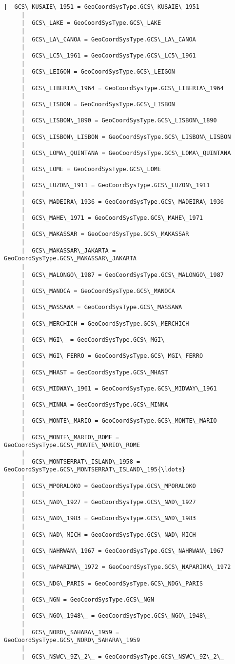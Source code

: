 \documentclass[11pt]{article}
\begin{document}
\begin{Verbatim}[commandchars=\\\{\}]
     |  GCS\_KUSAIE\_1951 = GeoCoordSysType.GCS\_KUSAIE\_1951
     |  
     |  GCS\_LAKE = GeoCoordSysType.GCS\_LAKE
     |  
     |  GCS\_LA\_CANOA = GeoCoordSysType.GCS\_LA\_CANOA
     |  
     |  GCS\_LC5\_1961 = GeoCoordSysType.GCS\_LC5\_1961
     |  
     |  GCS\_LEIGON = GeoCoordSysType.GCS\_LEIGON
     |  
     |  GCS\_LIBERIA\_1964 = GeoCoordSysType.GCS\_LIBERIA\_1964
     |  
     |  GCS\_LISBON = GeoCoordSysType.GCS\_LISBON
     |  
     |  GCS\_LISBON\_1890 = GeoCoordSysType.GCS\_LISBON\_1890
     |  
     |  GCS\_LISBON\_LISBON = GeoCoordSysType.GCS\_LISBON\_LISBON
     |  
     |  GCS\_LOMA\_QUINTANA = GeoCoordSysType.GCS\_LOMA\_QUINTANA
     |  
     |  GCS\_LOME = GeoCoordSysType.GCS\_LOME
     |  
     |  GCS\_LUZON\_1911 = GeoCoordSysType.GCS\_LUZON\_1911
     |  
     |  GCS\_MADEIRA\_1936 = GeoCoordSysType.GCS\_MADEIRA\_1936
     |  
     |  GCS\_MAHE\_1971 = GeoCoordSysType.GCS\_MAHE\_1971
     |  
     |  GCS\_MAKASSAR = GeoCoordSysType.GCS\_MAKASSAR
     |  
     |  GCS\_MAKASSAR\_JAKARTA = GeoCoordSysType.GCS\_MAKASSAR\_JAKARTA
     |  
     |  GCS\_MALONGO\_1987 = GeoCoordSysType.GCS\_MALONGO\_1987
     |  
     |  GCS\_MANOCA = GeoCoordSysType.GCS\_MANOCA
     |  
     |  GCS\_MASSAWA = GeoCoordSysType.GCS\_MASSAWA
     |  
     |  GCS\_MERCHICH = GeoCoordSysType.GCS\_MERCHICH
     |  
     |  GCS\_MGI\_ = GeoCoordSysType.GCS\_MGI\_
     |  
     |  GCS\_MGI\_FERRO = GeoCoordSysType.GCS\_MGI\_FERRO
     |  
     |  GCS\_MHAST = GeoCoordSysType.GCS\_MHAST
     |  
     |  GCS\_MIDWAY\_1961 = GeoCoordSysType.GCS\_MIDWAY\_1961
     |  
     |  GCS\_MINNA = GeoCoordSysType.GCS\_MINNA
     |  
     |  GCS\_MONTE\_MARIO = GeoCoordSysType.GCS\_MONTE\_MARIO
     |  
     |  GCS\_MONTE\_MARIO\_ROME = GeoCoordSysType.GCS\_MONTE\_MARIO\_ROME
     |  
     |  GCS\_MONTSERRAT\_ISLAND\_1958 = GeoCoordSysType.GCS\_MONTSERRAT\_ISLAND\_195{\ldots}
     |  
     |  GCS\_MPORALOKO = GeoCoordSysType.GCS\_MPORALOKO
     |  
     |  GCS\_NAD\_1927 = GeoCoordSysType.GCS\_NAD\_1927
     |  
     |  GCS\_NAD\_1983 = GeoCoordSysType.GCS\_NAD\_1983
     |  
     |  GCS\_NAD\_MICH = GeoCoordSysType.GCS\_NAD\_MICH
     |  
     |  GCS\_NAHRWAN\_1967 = GeoCoordSysType.GCS\_NAHRWAN\_1967
     |  
     |  GCS\_NAPARIMA\_1972 = GeoCoordSysType.GCS\_NAPARIMA\_1972
     |  
     |  GCS\_NDG\_PARIS = GeoCoordSysType.GCS\_NDG\_PARIS
     |  
     |  GCS\_NGN = GeoCoordSysType.GCS\_NGN
     |  
     |  GCS\_NGO\_1948\_ = GeoCoordSysType.GCS\_NGO\_1948\_
     |  
     |  GCS\_NORD\_SAHARA\_1959 = GeoCoordSysType.GCS\_NORD\_SAHARA\_1959
     |  
     |  GCS\_NSWC\_9Z\_2\_ = GeoCoordSysType.GCS\_NSWC\_9Z\_2\_

\end{Verbatim}
\end{document}
